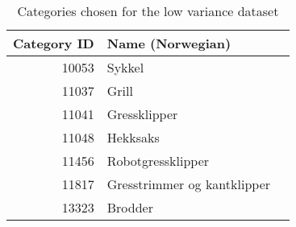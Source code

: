 \begin{table}[h]
\centering
\caption{Categories chosen for the low variance dataset}
\label{table:dataset-low_variance_categories}
\begin{tabular}{rll}
\toprule
 Category ID &            Name (Norwegian) \\
\midrule
       10053 &                      Sykkel \\
       11037 &                       Grill \\
       11041 &                Gressklipper \\
       11048 &                    Hekksaks \\
       11456 &           Robotgressklipper \\
       11817 & Gresstrimmer og kantklipper \\
       13323 &                     Brodder \\
\bottomrule
\end{tabular}
\end{table}
